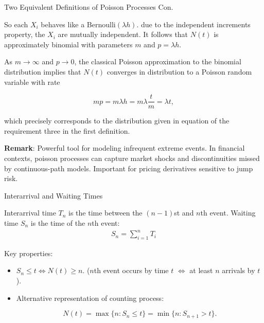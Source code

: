 \documentclass{beamer}
\begin{document}
\begin{frame}{Two Equivalent Definitions of Poisson Processes Con.}


    {\footnotesize \footnotesize
    \par So each $X_i$ behaves like a Bernoulli$(\lambda h)$. due to the independent increments property, the \( X_i \) are mutually independent. 
    It follows that \( N(t) \) is approximately binomial with parameters \( m \) and \( p = \lambda h \).
    \vspace{1em}
    \par As \( m \to \infty \) and \( p \to 0 \), the classical Poisson approximation to the binomial distribution implies
     that \( N(t) \) converges in distribution to a Poisson random variable with rate

        \[
        mp = m\lambda h = m\lambda \frac{t}{m} = \lambda t,
        \]
    \vspace{1em}
    \par  which precisely corresponds to the distribution given in equation of the requirement three in the first definition. 

    \vspace{1em}
    \par \textbf{Remark}: Powerful tool for modeling infrequent extreme events. In financial contexts, 
    poisson processes can capture market shocks and discontinuities missed by continuous-path models. Important for pricing derivatives sensitive to jump risk.

    }
\end{frame}


\begin{frame}{Interarrival and Waiting Times}


     {\footnotesize \footnotesize
    \par Interarrival time \( T_n \) is the time between the \((n - 1)\)st and \(n\)th event. Waiting time \( S_n \) is the time of the \(n\)th event:
    \begin{align*}
        S_n = \sum_{i=1}^n T_i
    \end{align*}
    \par Key properties:
    \vspace{1em}
    \begin{itemize}
        \item \( S_n \leq t \iff N(t) \geq n \). (\(n\)th event occurs by time \(t\) $\iff$ at least \(n\) arrivals by \(t\)).\vspace{1em}
        \item Alternative representation of counting process:
    
        \[
        N(t) = \max\{n : S_n \leq t\} = \min\{n : S_{n+1} > t\}.
        \]
    \end{itemize}
     }
    
\end{frame}
\end{document}

